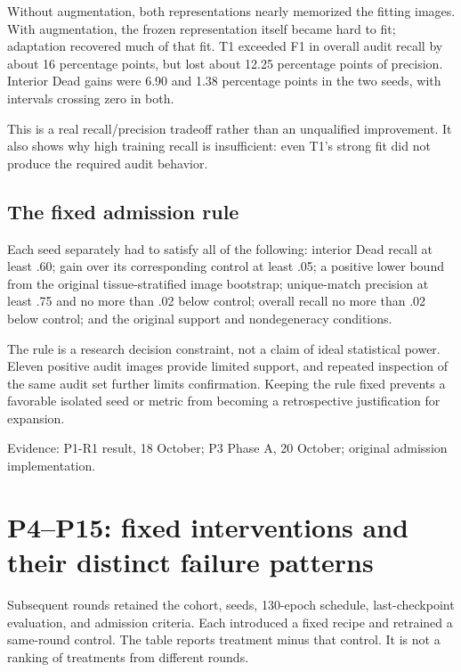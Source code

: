 \documentclass[11pt,a4paper]{article}
\newcommand{\src}[1]{\par{\footnotesize\color{gray}Evidence: #1}\par}
\begin{document}
Without augmentation, both representations nearly memorized the fitting images. With augmentation, the frozen representation itself became hard to fit; adaptation recovered much of that fit. T1 exceeded F1 in overall audit recall by about 16 percentage points, but lost about 12.25 percentage points of precision. Interior Dead gains were 6.90 and 1.38 percentage points in the two seeds, with intervals crossing zero in both.

This is a real recall/precision tradeoff rather than an unqualified improvement. It also shows why high training recall is insufficient: even T1's strong fit did not produce the required audit behavior.

\subsection{The fixed admission rule}

Each seed separately had to satisfy all of the following: interior Dead recall at least .60; gain over its corresponding control at least .05; a positive lower bound from the original tissue-stratified image bootstrap; unique-match precision at least .75 and no more than .02 below control; overall recall no more than .02 below control; and the original support and nondegeneracy conditions.

The rule is a research decision constraint, not a claim of ideal statistical power. Eleven positive audit images provide limited support, and repeated inspection of the same audit set further limits confirmation. Keeping the rule fixed prevents a favorable isolated seed or metric from becoming a retrospective justification for expansion.

\src{P1-R1 result, 18 October; P3 Phase A, 20 October; original admission implementation.}

\section{P4--P15: fixed interventions and their distinct failure patterns}

Subsequent rounds retained the cohort, seeds, 130-epoch schedule, last-checkpoint evaluation, and admission criteria. Each introduced a fixed recipe and retrained a same-round control. The table reports treatment minus that control. It is not a ranking of treatments from different rounds.
\end{document}
